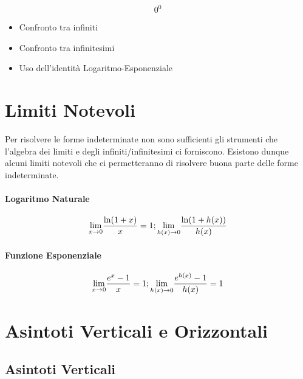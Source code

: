 \documentclass[12pt, a4paper, openany]{book}
\begin{document}
\paragraph*{}$$0^0$$
\begin{itemize}
	\item Confronto tra infiniti
	\item Confronto tra infinitesimi
	\item Uso dell'identità Logaritmo-Esponenziale
\end{itemize}

\section{Limiti Notevoli}
Per risolvere le forme indeterminate non sono sufficienti gli strumenti che l'algebra dei limiti e degli infiniti/infinitesimi ci forniscono.
Esistono dunque alcuni limiti notevoli che ci permetteranno di risolvere buona parte delle forme indeterminate.

\paragraph*{Logaritmo Naturale}
$$\underset{x \to 0}{\lim} \frac{\ln(1+x)}{x} = 1 ; \underset{h(x) \to 0}{\lim} \frac{\ln(1+h(x))}{h(x)}$$ 

\paragraph*{Funzione Esponenziale}
$$\underset{x \to 0}{\lim} \frac{e^x-1}{x} = 1; \underset{h(x) \to 0}{\lim} \frac{e^{h(x)}-1}{h(x)} = 1$$


\section{Asintoti Verticali e Orizzontali}
\subsection*{Asintoti Verticali}
\end{document}
